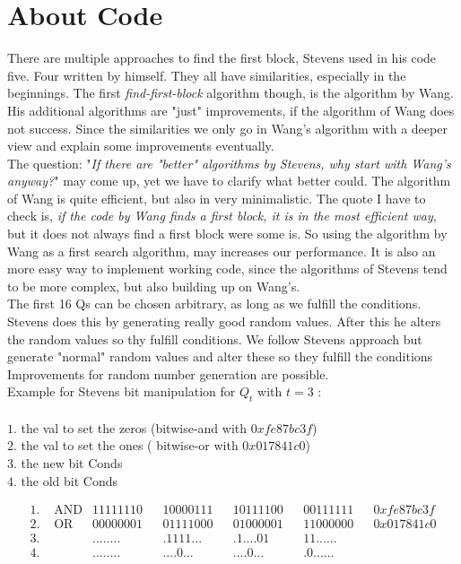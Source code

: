 \section{About Code}
There are multiple approaches to find the first block, Stevens used in his code five. Four written by himself.
They all have similarities, especially in the beginnings. 
The first \textit{find-first-block} algorithm though, is the algorithm by Wang. His additional algorithms are "just" improvements, if the algorithm of Wang does not success.
Since the similarities we only go in Wang's algorithm with a deeper view and explain some improvements eventually.\\
The question: "\textit{If there are "better" algorithms by Stevens, why start with Wang's anyway?}" may come up, yet we have to clarify what better could. The algorithm of Wang is quite efficient, but also in very minimalistic. 
The quote I have to check is, \textit{if the code by Wang finds a first block, it is in the most efficient way}, but it does not always find a first block were some is.
So using the algorithm by Wang as a first search algorithm, may increases our performance. It is also an more easy way to implement working code, since the algorithms of Stevens tend to be more complex, 
but also building up on Wang's.\\ 
The first 16 Qs can be chosen arbitrary, as long as we fulfill the conditions.
Stevens does this by generating really good random values.
After this he alters the random values so thy fulfill conditions.
We follow Stevens approach but generate "normal" random values and alter these so they fulfill the conditions
Improvements for random number generation are possible. \\
Example for Stevens bit manipulation for $Q_t$ with $t = 3$ :\\
\\
$1.$ the val to set the zeros (bitwise-and with $0xfe87bc3f$)\\
$2.$ the val to set the ones ( bitwise-or with $0x017841c0$)\\
$3.$ the new bit Conds\\
$4.$ the old bit Conds

\begin{align*}    
    1.& \text{ AND} & 11111110 & & 10000111 & & 10111100 & & 00111111 & & 0xfe87bc3f \\
    2.& \text{ OR}  & 00000001 & & 01111000 & & 01000001 & & 11000000 & & 0x017841c0 \\
    3.&             & ........ & & .1111... & & .1....01 & & 11...... & &  \\
    4.&             & ........ & & ....0... & & ....0... & & .0...... & &  
\end{align*}

